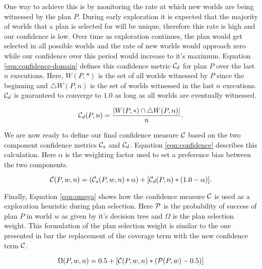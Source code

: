 One way to achieve this is by monitoring the rate at which new worlds are being witnessed by the plan $P$. During early exploration it is expected that the majority of worlds that a plan is selected for will be unique, therefore this rate is high and our confidence is low. Over time as exploration continues, the plan would get selected in all possible worlds and the rate of new worlds would approach zero while our confidence over this period would increase to it's maximum.  Equation \ref{eqn:confidence-domain} defines this confidence metric $\C_d$ for plan $P$ over the last $n$ executions. Here, $W(P,*)$ is the set of all worlds witnessed by $P$ since the beginning and $\triangle W(P,n)$ is the set of worlds witnessed in the last $n$ executions. $\C_d$ is guaranteed to converge to $1.0$ as long as all worlds are eventually witnessed.

\begin{equation}
\C_d(P,n) = \frac{|W(P,*)\cap \triangle W(P,n) |}{n}.
\label{eqn:confidence-domain}
\end{equation}

We are now ready to define our final confidence measure $\C$ based on the two component confidence metrics $\C_s$ and $\C_d$. Equation \ref{eqn:confidence} describes this calculation. Here $\alpha$ is the weighting factor used to set a preference bias between the two components.

\begin{equation}
\C(P,w,n) = (\C_s(P,w,n)*\alpha) + [\C_d(P,n)*(1.0-\alpha)].
\label{eqn:confidence}
\end{equation}

Finally, Equation \ref{eqn:omega} shows how the confidence measure $\C$ is used as a exploration heuristic during plan selection. Here $\P$ is the probability of success of plan $P$ in world $w$ as given by it's decision tree and $\Omega$ is the plan selection weight. This formulation of the plan selection weight is similar to the one presented in \cite{singh10:extending} bar the replacement of the coverage term with the new confidence term $\C$.

\begin{equation}
\Omega(P,w,n) = 0.5 + \left[  \C(P,w,n) *  \left( \P(P,w) - 0.5 \right)  \right]
\label{eqn:omega}   
\end{equation}


